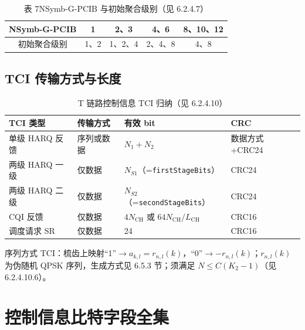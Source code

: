 \documentclass[11pt,a4paper]{ctexart}
\begin{document}
\begin{table}[h]
\centering
\small
\caption{表 7\quad NSymb-G-PCIB 与初始聚合级别（见 6.2.4.7）}
\begin{tabular}{ccccc}
\toprule
NSymb-G-PCIB & 1 & 2、3 & 4、6 & 8、10、12 \\
\midrule
初始聚合级别 & 1、2 & 1、2、4 & 2、4、8 & 4、8 \\
\bottomrule
\end{tabular}
\end{table}

\subsection{TCI 传输方式与长度}

\begin{table}[h]
\centering
\small
\caption{T 链路控制信息 TCI 归纳（见 6.2.4.10）}
\begin{tabular}{L{3.5cm}lll}
\toprule
\textbf{TCI 类型} & \textbf{传输方式} & \textbf{有效 bit} & \textbf{CRC} \\
\midrule
单级 HARQ 反馈 & 序列或数据 & $N_1{+}N_2$ & 数据方式 +CRC24 \\
两级 HARQ 一级 & 仅数据 & $N_{S1}$（=\texttt{firstStageBits}） & CRC24 \\
两级 HARQ 二级 & 仅数据 & $N_{S2}$（=\texttt{secondStageBits}） & CRC24 \\
CQI 反馈 & 仅数据 & $4N_{\mathrm{CH}}$ 或 $64N_{\mathrm{CH}}/L_{\mathrm{CH}}$ & CRC16 \\
调度请求 SR & 仅数据 & 24 & CRC16 \\
\bottomrule
\end{tabular}
\end{table}

序列方式 TCI：梳齿上映射``1''$\rightarrow a_{k,l}{=}r_{n,l}(k)$，``0''$\rightarrow -r_{n,l}(k)$；$r_{n,l}(k)$ 为伪随机 QPSK 序列，生成方式见 6.5.3 节；须满足 $N \leq C(K_2{-}1)$（见 6.2.4.10.6）。

\section{控制信息比特字段全集}
\end{document}
